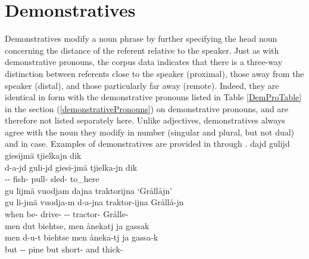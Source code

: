 \section{Demonstratives}\label{demonstratives}
Demonstratives %
modify a noun phrase by further specifying the head noun concerning the distance of the referent relative to the speaker. Just as with demonstrative pronouns, the corpus data indicates that there is a three-way distinction between referents close to the speaker (proximal), those away from the speaker (distal), and those particularly far away (remote). 
Indeed, they are identical in form with the demonstrative pronouns listed in Table \vref{DemProTable} in the section (\ref{demonstrativePronouns}) on demonstrative pronouns, and are therefore not listed separately here. 
Unlike adjectives, demonstratives always agree with the noun they modify in number (singular and plural, but not dual) and in case. %
Examples of demonstratives %
are provided in  through .
\ea\label{demonstrativeAdjectivesEx1}
\glll	dajd gulijd giesijmä tjielkajn dik\\
	d-a-jd guli-jd giesi-jmä tjielka-jn dik\\
	-- fish- pull- sled- to\_here\\\nopagebreak
{}	
\z
\ea\label{demonstrativeAdjectivesEx2}
\glll	gu lijmä vuodjam dajna traktorijna ‘Grållåjn’\\
	gu li-jmä vuodja-m d-a-jna traktor-ijna Grållå-jn\\
	when be- drive- -- tractor- Grålle-\\\nopagebreak
{}	
\z
\ea\label{demonstrativeAdjectivesEx3}
\glll	men dut biehtse, men ånekatj ja gassak\\
	men d-u-t biehtse men åneka-tj ja gassa-k\\
	but -- pine\BS{} but short- and thick-\\\nopagebreak
{}	
\z




